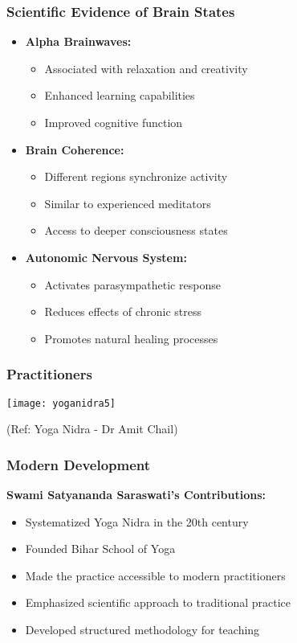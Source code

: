 \begin{frame}[fragile]\frametitle{Scientific Evidence of Brain States}
    \begin{itemize}
        \item \textbf{Alpha Brainwaves:}
        \begin{itemize}
            \item Associated with relaxation and creativity
            \item Enhanced learning capabilities
            \item Improved cognitive function
        \end{itemize}
        \item \textbf{Brain Coherence:}
        \begin{itemize}
            \item Different regions synchronize activity
            \item Similar to experienced meditators
            \item Access to deeper consciousness states
        \end{itemize}
        \item \textbf{Autonomic Nervous System:}
        \begin{itemize}
            \item Activates parasympathetic response
            \item Reduces effects of chronic stress
            \item Promotes natural healing processes
        \end{itemize}
    \end{itemize}
\end{frame}

\begin{frame}[fragile]\frametitle{Practitioners}
      \begin{center}
        \texttt{[image: yoganidra5]}

		{\tiny (Ref: Yoga Nidra - Dr Amit Chail)}		
        \end{center}

\end{frame}

\begin{frame}[fragile]\frametitle{Modern Development}
    \textbf{Swami Satyananda Saraswati's Contributions:}
    \begin{itemize}
        \item Systematized Yoga Nidra in the 20th century
        \item Founded Bihar School of Yoga
        \item Made the practice accessible to modern practitioners
        \item Emphasized scientific approach to traditional practice
        \item Developed structured methodology for teaching
    \end{itemize}
\end{frame}

